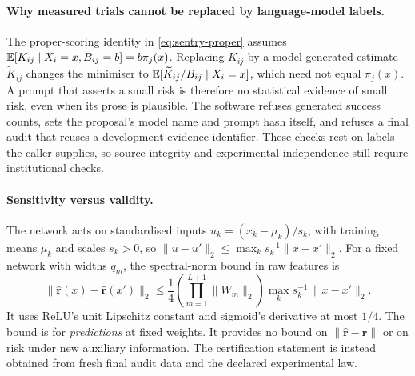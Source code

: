 \paragraph{Why measured trials cannot be replaced by language-model labels.}
The proper-scoring identity in \eqref{eq:sentry-proper} assumes
$\mathbb{E}[K_{ij}\mid X_i=x,B_{ij}=b]=b\pi_j(x)$. Replacing $K_{ij}$ by a
model-generated estimate $\widetilde K_{ij}$ changes the minimiser to
$\mathbb{E}[\widetilde K_{ij}/B_{ij}\mid X_i=x]$, which need not equal
$\pi_j(x)$. A prompt that asserts a small risk is therefore no statistical
evidence of small risk, even when its prose is plausible. The software
refuses generated success counts, sets the proposal's model name and prompt
hash itself, and refuses a final audit that reuses a development evidence
identifier. These checks rest on labels the caller supplies, so source
integrity and experimental independence still require institutional checks.

\paragraph{Sensitivity versus validity.}
The network acts on standardised inputs $u_k=(x_k-\mu_k)/s_k$, with training
means $\mu_k$ and scales $s_k>0$, so
$\|u-u'\|_2\leq\max_k s_k^{-1}\|x-x'\|_2$. For a fixed network with widths
$q_m$, the spectral-norm bound in raw features is
\begin{equation}
 \|\widehat{\boldsymbol r}(x)-\widehat{\boldsymbol r}(x')\|_2
 \leq\frac14\left(\prod_{m=1}^{L+1}\|W_m\|_2\right)
 \max_k s_k^{-1}\,\|x-x'\|_2.
 \label{eq:sentry-lipschitz}
\end{equation}
It uses ReLU's unit Lipschitz constant and sigmoid's derivative at most $1/4$.
The bound is for \emph{predictions} at fixed weights. It provides no bound on
$\|\widehat{\boldsymbol r}-\boldsymbol r\|$ or on risk under new auxiliary
information. The certification statement is instead obtained from fresh
final audit data and the declared experimental law.
